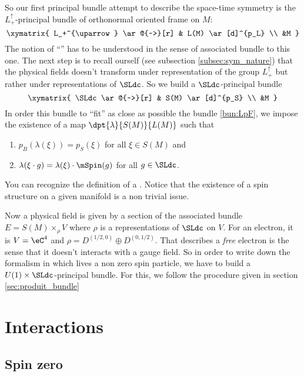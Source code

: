 So our first principal bundle attempt to describe the space-time symmetry is the $L_+^{\uparrow}$-principal bundle of orthonormal oriented frame on $M$:
 \begin{equation}\label{bun:LpF}
\xymatrix{
    L_+^{\uparrow}  \ar@{~>}[r] & L(M) \ar[d]^{p_L} \\
    &M
  }
\end{equation}
The notion of ``'' has to be understood in the sense of associated bundle to this one. The next step is to recall ourself (see subsection \ref{subsec:sym_nature}) that the physical fields doesn't transform under representation of the group $L_+^{\uparrow}$ but rather under representations of $\SLdc$. So we build a $\SLdc$-principal bundle
 \[
\xymatrix{
    \SLdc  \ar@{~>}[r] & S(M) \ar[d]^{p_S} \\
    &M
  }
\]
In order this bundle to ``fit''{} as close as possible the bundle \eqref{bun:LpF}, we impose the existence of a map $\dpt{\lambda}{S(M)}{L(M)}$ such that

\begin{enumerate}
\item $p_B(\lambda(\xi))=p_S(\xi)$ for all $\xi\in S(M)$ and
\item $\lambda(\xi\cdot g)=\lambda(\xi)\cdot\mSpin(g)$ for all $g\in\SLdc$.
\end{enumerate}
You can recognize the definition of a \label{pg_spinenphyz}. Notice that the existence of a spin structure on a given manifold is a non trivial issue.

Now a physical field is given by a section of the associated bundle $E=S(M)\times_{\rho} V$ where $\rho$ is a representations of $\SLdc$ on $V$. For an electron, it is $V=\eC^4$ and $\rho=D^{(1/2,0)}\oplus D^{(0,1/2)}$. That describes a \emph{free} electron is the sense that it doesn't interacts with a gauge field. So in order to write down the formalism in which lives a non zero spin particle, we have to build a $U(1)\times\SLdc$-principal bundle. For this, we follow the procedure given in section \ref{sec:produit_bundle}

\section{Interactions}

\subsection{Spin zero}

